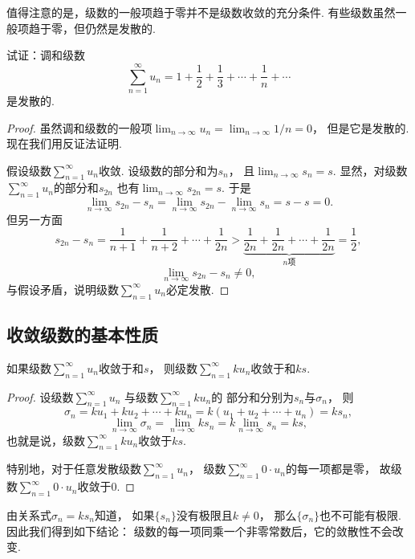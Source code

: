 值得注意的是，级数的一般项趋于零并不是级数收敛的充分条件.
有些级数虽然一般项趋于零，但仍然是发散的.
\begin{example}\label{example:无穷级数.调和级数的敛散性}
试证：调和级数\[
	\sum_{n=1}^\infty u_n
	= 1+\frac12+\frac13+\dotsb+\frac1n+\dotsb
\]是发散的.
\begin{proof}
虽然调和级数的一般项\(\lim_{n\to\infty} u_n
= \lim_{n\to\infty} 1/n
= 0\)，
但是它是发散的.
现在我们用反证法证明.

假设级数\(\sum_{n=1}^\infty u_n\)收敛.
设级数的部分和为\(s_n\)，
且\(\lim_{n\to\infty} s_n
= s\).
显然，对级数\(\sum_{n=1}^\infty u_n\)的部分和\(s_{2n}\)
也有\(\lim_{n\to\infty} s_{2n}
= s\).
于是\[
	\lim_{n\to\infty} {s_{2n}-s_n}
	= \lim_{n\to\infty} s_{2n} - \lim_{n\to\infty} s_n
	= s - s
	= 0.
\]
但另一方面\[
	s_{2n} - s_n
	= \frac{1}{n+1}+\frac{1}{n+2}+\dotsb+\frac{1}{2n}
	> \underbrace{\frac{1}{2n}+\frac{1}{2n}+\dotsb+\frac{1}{2n}}_{n\text{项}}
	= \frac{1}{2},
\]\[
	\lim_{n\to\infty} {s_{2n}-s_n}
	\neq 0,
\]与假设矛盾，说明级数\(\sum_{n=1}^\infty u_n\)必定发散.
\end{proof}
\end{example}

\subsection{收敛级数的基本性质}
\begin{property}\label{theorem:无穷级数.收敛级数性质1}
如果级数\(\sum_{n=1}^\infty u_n\)收敛于和\(s\)，
则级数\(\sum_{n=1}^\infty k u_n\)收敛于和\(ks\).
\begin{proof}
设级数\(\sum_{n=1}^\infty u_n\)
与级数\(\sum_{n=1}^\infty k u_n\)的
部分和分别为\(s_n\)与\(\sigma_n\)，
则\[
	\sigma_n
	= k u_1 + k u_2 + \dotsb + k u_n
	= k(u_1 + u_2 + \dotsb + u_n) = k s_n,
\]\[
	\lim_{n\to\infty} \sigma_n
	= \lim_{n\to\infty} k s_n
	= k \lim_{n\to\infty} s_n = ks,
\]
也就是说，级数\(\sum_{n=1}^\infty k u_n\)收敛于\(ks\).

特别地，对于任意发散级数\(\sum_{n=1}^\infty u_n\)，
级数\(\sum_{n=1}^\infty 0 \cdot u_n\)的每一项都是零，
故级数\(\sum_{n=1}^\infty 0 \cdot u_n\)收敛于\(0\).
\end{proof}
\end{property}

由关系式\(\sigma_n = k s_n\)知道，
如果\(\{s_n\}\)没有极限且\(k\neq0\)，
那么\(\{\sigma_n\}\)也不可能有极限.
因此我们得到如下结论：
{\color{red}级数的每一项同乘一个非零常数后，它的敛散性不会改变.}

